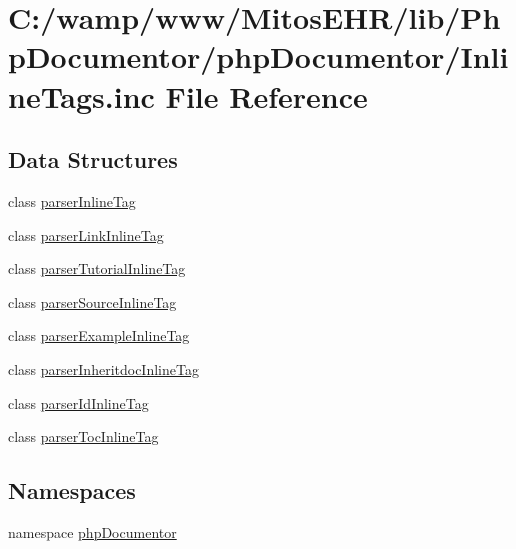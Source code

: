 \hypertarget{_inline_tags_8inc}{\section{\-C\-:/wamp/www/\-Mitos\-E\-H\-R/lib/\-Php\-Documentor/php\-Documentor/\-Inline\-Tags.inc \-File \-Reference}
\label{_inline_tags_8inc}
}
\subsection*{\-Data \-Structures}
\begin{DoxyCompactItemize}
\item 
class \hyperlink{classparser_inline_tag}{parser\-Inline\-Tag}
\item 
class \hyperlink{classparser_link_inline_tag}{parser\-Link\-Inline\-Tag}
\item 
class \hyperlink{classparser_tutorial_inline_tag}{parser\-Tutorial\-Inline\-Tag}
\item 
class \hyperlink{classparser_source_inline_tag}{parser\-Source\-Inline\-Tag}
\item 
class \hyperlink{classparser_example_inline_tag}{parser\-Example\-Inline\-Tag}
\item 
class \hyperlink{classparser_inheritdoc_inline_tag}{parser\-Inheritdoc\-Inline\-Tag}
\item 
class \hyperlink{classparser_id_inline_tag}{parser\-Id\-Inline\-Tag}
\item 
class \hyperlink{classparser_toc_inline_tag}{parser\-Toc\-Inline\-Tag}
\end{DoxyCompactItemize}
\subsection*{\-Namespaces}
\begin{DoxyCompactItemize}
\item 
namespace \hyperlink{namespacephp_documentor}{php\-Documentor}
\end{DoxyCompactItemize}
